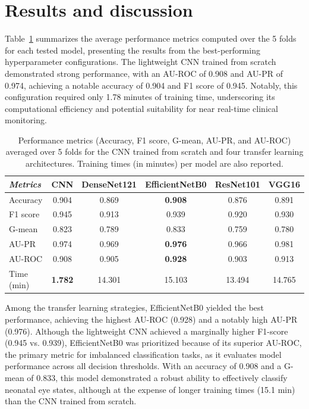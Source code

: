 \documentclass[runningheads]{llncs}
\begin{document}
\section{Results and discussion}
\label{sec:results}

Table~\ref{tab:metrics} summarizes the average performance metrics computed over the 5 folds for each tested model, presenting the results from the best-performing hyperparameter configurations. The lightweight CNN trained from scratch demonstrated strong performance, with an AU-ROC of 0.908 and AU-PR of 0.974, achieving a notable accuracy of 0.904 and F1 score of 0.945. Notably, this configuration required only 1.78 minutes of training time, underscoring its computational efficiency and potential suitability for near real-time clinical monitoring.

\begin{table}[ht]
\centering
\renewcommand{\arraystretch}{1.2}
\setlength{\tabcolsep}{4.5pt}
\caption{Performance metrics (Accuracy, F1 score, G-mean, AU-PR, and AU-ROC) averaged over 5 folds for the CNN trained from scratch and four transfer learning architectures. Training times (in minutes) per model are also reported.}
\centering
\begin{tabular}{|l|c|c|c|c|c|}
\hline
\rowcolor{gray!10}
 \textit{Metrics} & \textbf{CNN} & \textbf{DenseNet121} & \textbf{EfficientNetB0} & \textbf{ResNet101} & \textbf{VGG16} \\
\hline
\cellcolor{gray!10} Accuracy   & 0.904 & 0.869 & \textbf{0.908} & 0.876 & 0.891 \\
\cellcolor{gray!10} F1 score   & 0.945 & 0.913 & 0.939 & 0.920 & 0.930 \\
\cellcolor{gray!10} G-mean     & 0.823 & 0.789 & 0.833 & 0.759 & 0.780 \\
\cellcolor{gray!10} AU-PR      & 0.974 & 0.969 & \textbf{0.976} & 0.966 & 0.981 \\
\cellcolor{gray!10} AU-ROC     & 0.908 & 0.905 & \textbf{0.928} & 0.903 & 0.913 \\
\cellcolor{gray!10} Time (min)& \textbf{1.782}  & 14.301 & 15.103 & 13.494 & 14.765 \\
\hline
\end{tabular}
\label{tab:metrics}
\end{table}

Among the transfer learning strategies, EfficientNetB0 yielded the best performance, achieving the highest AU-ROC (0.928) and a notably high AU-PR (0.976). Although the lightweight CNN achieved a marginally higher F1-score (0.945 vs. 0.939), EfficientNetB0 was prioritized because of its superior AU-ROC, the primary metric for imbalanced classification tasks, as it evaluates model performance across all decision thresholds. With an accuracy of 0.908 and a G-mean of 0.833, this model demonstrated a robust ability to effectively classify neonatal eye states, although at the expense of longer training times (15.1 min) than the CNN trained from scratch. 
\end{document}

